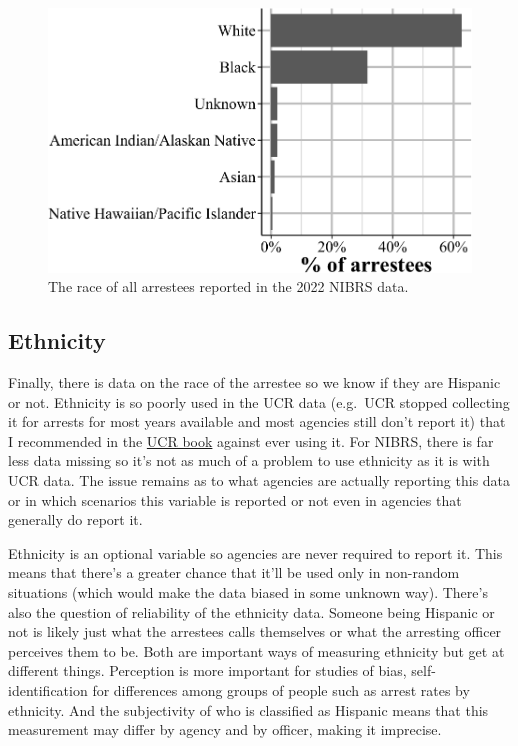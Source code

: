 \documentclass[
  12pt,
  openany]{book}
\begin{document}
\begin{figure}

{\centering \includegraphics[width=0.9\linewidth]{16_nibrs_arrestee_files/figure-latex/arresteeRace-1} 

}

\caption{The race of all arrestees reported in the 2022 NIBRS data.}\label{fig:arresteeRace}
\end{figure}

\subsection{Ethnicity}\label{ethnicity-3}

Finally, there is data on the race of the arrestee so we know if they are Hispanic or not. Ethnicity is so poorly used in the UCR data (e.g.~UCR stopped collecting it for arrests for most years available and most agencies still don't report it) that I recommended in the \href{https://ucrbook.com/}{UCR book} against ever using it. For NIBRS, there is far less data missing so it's not as much of a problem to use ethnicity as it is with UCR data. The issue remains as to what agencies are actually reporting this data or in which scenarios this variable is reported or not even in agencies that generally do report it.

Ethnicity is an optional variable so agencies are never required to report it. This means that there's a greater chance that it'll be used only in non-random situations (which would make the data biased in some unknown way). There's also the question of reliability of the ethnicity data. Someone being Hispanic or not is likely just what the arrestees calls themselves or what the arresting officer perceives them to be. Both are important ways of measuring ethnicity but get at different things. Perception is more important for studies of bias, self-identification for differences among groups of people such as arrest rates by ethnicity. And the subjectivity of who is classified as Hispanic means that this measurement may differ by agency and by officer, making it imprecise.
\end{document}
